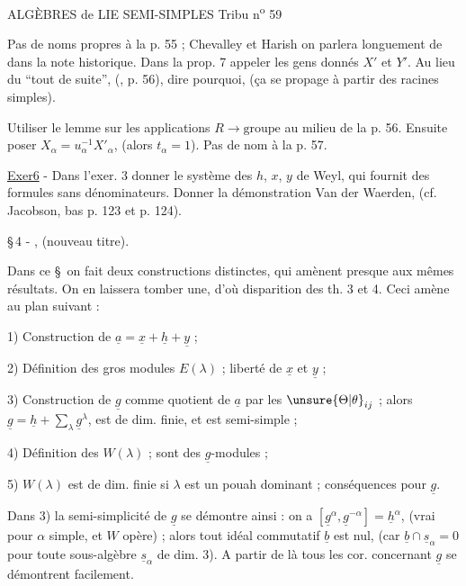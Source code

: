 ALGÈBRES de LIE SEMI-SIMPLES \hfill Tribu n\textsuperscript{o} 59

Pas de noms propres à la p. 55 ; Chevalley et Harish on parlera longuement de dans la note historique. Dans la prop. 7 appeler les gens donnés $X'$ et $Y'$. Au lieu du ``tout de suite'', (, p. 56), dire pourquoi, (ça se propage à partir des racines simples).

Utiliser le lemme sur les applications $R\longrightarrow\text{groupe}$ au milieu de la p. 56. Ensuite poser $X_\alpha=u_\alpha^{-1}X'_\alpha$, (alors $t_\alpha=1$). Pas de nom à la p. 57.

\uline{Exer6} - Dans l'exer. 3 donner le système des $h$, $x$, $y$ de Weyl, qui fournit des formules sans dénominateurs. Donner la démonstration Van der Waerden, (cf. Jacobson, bas p. 123 et p. 124).

\S\,4 - , (nouveau titre).

Dans ce \S\ on fait deux constructions distinctes, qui amènent presque aux mêmes résultats. On en laissera tomber une, d'où disparition des th. 3 et 4. Ceci amène au plan suivant :

1) Construction de $\underline{a}=\underline{x}+\underline{h}+\underline{y}$ ;

2) Définition des gros modules $E(\lambda)$ ; liberté de $\underline{x}$ et $\underline{y}$ ;

3) Construction de $\underline{g}$ comme quotient de $\underline{a}$ par les $\unsure{\Theta|\theta}_{ij}$ ; alors $\underline{g}=\underline{h}+\sum_{\lambda}\underline{g}^{\lambda}$, est de dim. finie, et est semi-simple ;

4) Définition des $W(\lambda)$ ; sont des $\underline{g}$-modules ;

5) $W(\lambda)$ est de dim. finie si $\lambda$ est un pouah dominant ; conséquences pour $\underline{g}$.

Dans 3) la semi-simplicité de $\underline{g}$ se démontre ainsi : on a $[\underline{g}^{\alpha},\underline{g}^{-\alpha}]=\underline{h}^{\alpha}$, (vrai pour $\alpha$ simple, et $W$ opère) ; alors tout idéal commutatif $\underline{b}$ est nul, (car $\underline{b}\cap\underline{s}_\alpha=0$ pour toute sous-algèbre $\underline{s}_\alpha$ de dim. 3). A partir de là tous les cor. concernant $\underline{g}$ se démontrent facilement.
